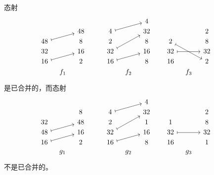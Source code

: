 \begin{example}\label{coalescedmorphismsinCexample}
    态射
    \[ \begin{tikzcd} [row sep = 1, column sep = 8]
    & & & & & & & 4 & & & & & \\
     & & 48 & & & 4 \ar[urr,mapsto] & & 32 & & & & 2 \\
    48 \ar[rru,mapsto] & & 8 & & & 2 & & 8 & & 2 \ar[rrdd,mapsto] & & 8 \\
    32 & & 16 & & & 32 \ar[uurr,mapsto] & & 16 & & 32 \ar[rr,mapsto] & & 32 \\
    16 \ar[rru,mapsto] & & 2 & & & 16 \ar[urr,mapsto] & & 8 & & 16 & & 2 \\
    & f_1 & & & & & f_2 & & & &  f_3 & \\
    \end{tikzcd} \]
    是已合并的，而态射
    \[ \begin{tikzcd} [row sep = 1, column sep = 8]
    & & & & & & & 4 & & & & & \\
     & & 8 & & & 4 \ar[urr,mapsto] & & 32 & & & & 2 \\
    32 & & 48 & & & 2 & & 1 & & 1 & & 8 \\
    48 \ar[urr,mapsto] & & 16 & & & 32 \ar[uurr,mapsto] & & 16 & & 32 \ar[rr,mapsto] & & 32 \\
    16 \ar[rru,mapsto] & & 2 & & & 16 \ar[urr,mapsto] & & 8 & & 16 & & 1 \\
    & g_1 & & & & & g_2 & & & &  g_3 & \\
    \end{tikzcd} \]
    不是已合并的。
\end{example}


